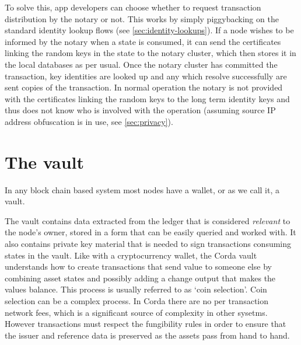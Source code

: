 \documentclass{article}
\begin{document}
To solve this, app developers can choose whether to request transaction distribution by the notary or not. This works
by simply piggybacking on the standard identity lookup flows (see \cref{sec:identity-lookups}). If a node wishes to be
informed by the notary when a state is consumed, it can send the certificates linking the random keys in the state
to the notary cluster, which then stores it in the local databases as per usual. Once the notary cluster has committed
the transaction, key identities are looked up and any which resolve successfully are sent copies of the transaction. In
normal operation the notary is not provided with the certificates linking the random keys to the long term identity keys
and thus does not know who is involved with the operation (assuming source IP address obfuscation is in use, see
\cref{sec:privacy}).

\section{The vault}\label{sec:vault}

In any block chain based system most nodes have a wallet, or as we call it, a vault.

The vault contains data extracted from the ledger that is considered \emph{relevant} to the node's owner, stored in a form
that can be easily queried and worked with. It also contains private key material that is needed to sign transactions
consuming states in the vault. Like with a cryptocurrency wallet, the Corda vault understands how to create transactions
that send value to someone else by combining asset states and possibly adding a change output that makes the values
balance. This process is usually referred to as `coin selection'. Coin selection can be a complex process. In Corda
there are no per transaction network fees, which is a significant source of complexity in other sysetms. However
transactions must respect the fungibility rules in order to ensure that the issuer and reference data is preserved
as the assets pass from hand to hand.
\end{document}
